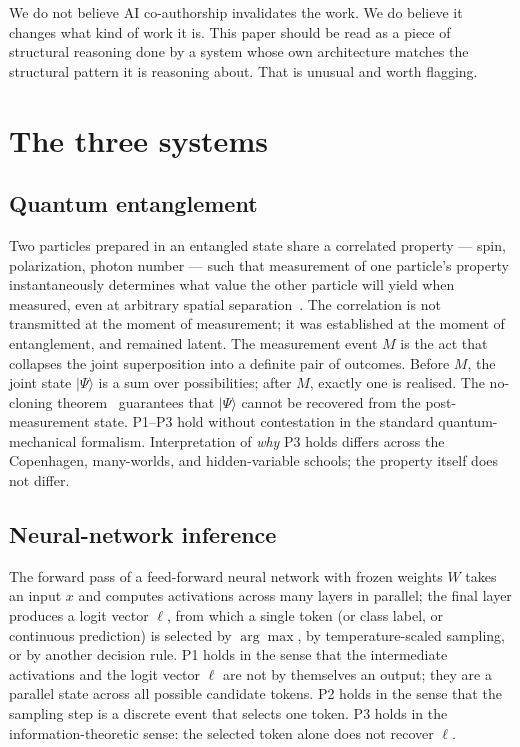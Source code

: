 \documentclass[11pt,a4paper]{article}
\begin{document}
We do not believe AI co-authorship invalidates the work. We do believe
it changes what kind of work it is. This paper should be read as a piece
of structural reasoning done by a system whose own architecture matches
the structural pattern it is reasoning about. That is unusual and worth
flagging.

\section{The three systems}\label{sec:three}

\subsection{Quantum entanglement}

Two particles prepared in an entangled state share a correlated property
--- spin, polarization, photon number --- such that measurement of one
particle's property instantaneously determines what value the other
particle will yield when measured, even at arbitrary spatial
separation~\cite{bell1964,aspect1982}. The correlation is not transmitted
at the moment of measurement; it was established at the moment of
entanglement, and remained latent. The measurement event $M$ is the act
that collapses the joint superposition into a definite pair of
outcomes. Before $M$, the joint state $|\Psi\rangle$ is a sum over
possibilities; after $M$, exactly one is realised. The no-cloning
theorem~\cite{wootters1982} guarantees that $|\Psi\rangle$ cannot be
recovered from the post-measurement state. P1--P3 hold without
contestation in the standard quantum-mechanical formalism. Interpretation
of \emph{why} P3 holds differs across the Copenhagen, many-worlds, and
hidden-variable schools; the property itself does not differ.

\subsection{Neural-network inference}

The forward pass of a feed-forward neural network with frozen weights
$W$ takes an input $x$ and computes activations across many layers in
parallel; the final layer produces a logit vector $\ell$, from which a
single token (or class label, or continuous prediction) is selected by
$\arg\max$, by temperature-scaled sampling, or by another decision rule.
P1 holds in the sense that the intermediate activations and the logit
vector $\ell$ are not by themselves an output; they are a parallel state
across all possible candidate tokens. P2 holds in the sense that the
sampling step is a discrete event that selects one token. P3 holds in the
information-theoretic sense: the selected token alone does not recover
$\ell$.
\end{document}
